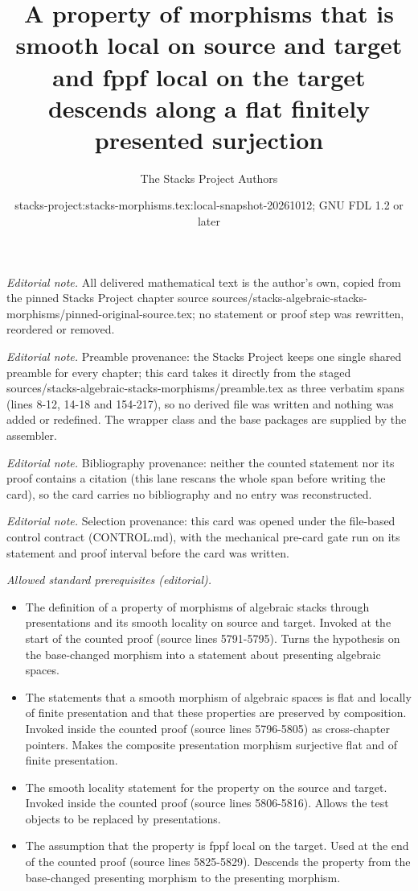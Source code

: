 \documentclass[10pt,a4paper]{amsart}
\title{A property of morphisms that is smooth local on source and target and fppf local on the target descends along a flat finitely presented surjection}
\author{The Stacks Project Authors}
\date{stacks-project:stacks-morphisms.tex:local-snapshot-20261012; GNU FDL 1.2 or later}
\theoremstyle{plain}
\theoremstyle{definition}
\theoremstyle{remark}
\numberwithin{equation}{subsection}
\begin{document}
\maketitle
\noindent\textit{Editorial note.} All delivered mathematical text is the author's own, copied from the pinned Stacks Project chapter source sources/stacks-algebraic-stacks-morphisms/pinned-original-source.tex; no statement or proof step was rewritten, reordered or removed.\par\medskip
\noindent\textit{Editorial note.} Preamble provenance: the Stacks Project keeps one single shared preamble for every chapter; this card takes it directly from the staged sources/stacks-algebraic-stacks-morphisms/preamble.tex as three verbatim spans (lines 8-12, 14-18 and 154-217), so no derived file was written and nothing was added or redefined. The wrapper class and the base packages are supplied by the assembler.\par\medskip
\noindent\textit{Editorial note.} Bibliography provenance: neither the counted statement nor its proof contains a citation (this lane rescans the whole span before writing the card), so the card carries no bibliography and no entry was reconstructed.\par\medskip
\noindent\textit{Editorial note.} Selection provenance: this card was opened under the file-based control contract (CONTROL.md), with the mechanical pre-card gate run on its statement and proof interval before the card was written.\par\medskip
\noindent\textit{Allowed standard prerequisites (editorial).}\begin{itemize}
\item The definition of a property of morphisms of algebraic stacks through presentations and its smooth locality on source and target. Invoked at the start of the counted proof (source lines 5791-5795). Turns the hypothesis on the base-changed morphism into a statement about presenting algebraic spaces.
\item The statements that a smooth morphism of algebraic spaces is flat and locally of finite presentation and that these properties are preserved by composition. Invoked inside the counted proof (source lines 5796-5805) as cross-chapter pointers. Makes the composite presentation morphism surjective flat and of finite presentation.
\item The smooth locality statement for the property on the source and target. Invoked inside the counted proof (source lines 5806-5816). Allows the test objects to be replaced by presentations.
\item The assumption that the property is fppf local on the target. Used at the end of the counted proof (source lines 5825-5829). Descends the property from the base-changed presenting morphism to the presenting morphism.
\end{itemize}\medskip
\end{document}
